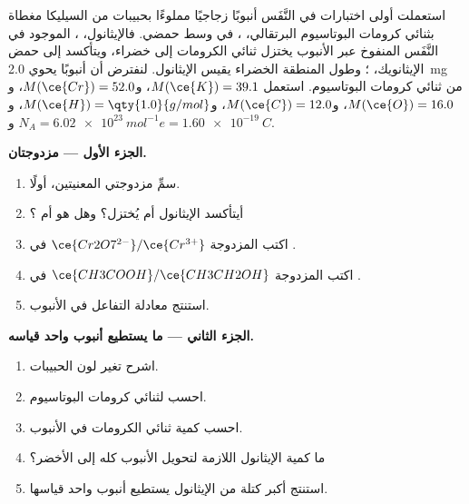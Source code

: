 \begin{problem}
\label{pb:g11:redox:1}
استعملت أولى اختبارات  في النَّفَس أنبوبًا زجاجيًا مملوءًا بحبيبات من
السيليكا مغطاة بثنائي كرومات البوتاسيوم البرتقالي، ، في وسط حمضي.
فالإيثانول، ، الموجود في النَّفَس المنفوخ عبر الأنبوب يختزل
 ثنائي الكرومات إلى   خضراء، ويتأكسد إلى حمض
الإيثانويك، ؛ وطول المنطقة الخضراء يقيس الإيثانول.
لنفترض أن أنبوبًا يحوي \qty{2.0}{mg} من ثنائي كرومات البوتاسيوم. استعمل
$M(\ce{K}) = 39.1$، و$M(\ce{Cr}) = 52.0$، و$M(\ce{O}) = 16.0$،
و$M(\ce{C}) = 12.0$، و$M(\ce{H}) = \qty{1.0}{g/mol}$، و$N_A =
\qty{6.02e23}{mol^{-1}}$ و$e = \qty{1.60e-19}{C}$.

\medskip
\noindent\textbf{الجزء الأول --- مزدوجتان.}
\begin{enumerate}
  \item سمِّ مزدوجتي   المعنيتين،  أولًا.
  \item أيتأكسد الإيثانول أم يُختزل؟ وهل هو  أم
        ؟
  \item اكتب  المزدوجة
        $\ce{Cr2O7^{2-}}/\ce{Cr^{3+}}$ في .
  \item اكتب  المزدوجة
        $\ce{CH3COOH}/\ce{CH3CH2OH}$ في .
  \item استنتج معادلة التفاعل في الأنبوب.
\end{enumerate}

\medskip
\noindent\textbf{الجزء الثاني --- ما يستطيع أنبوب واحد قياسه.}
\begin{enumerate}[resume]
  \item اشرح تغير لون الحبيبات.
  \item احسب  لثنائي كرومات البوتاسيوم.
  \item احسب كمية  ثنائي الكرومات في الأنبوب.
  \item ما كمية الإيثانول اللازمة لتحويل الأنبوب كله إلى الأخضر؟
  \item استنتج أكبر كتلة من الإيثانول يستطيع أنبوب واحد قياسها.
\end{enumerate}


\end{problem}
